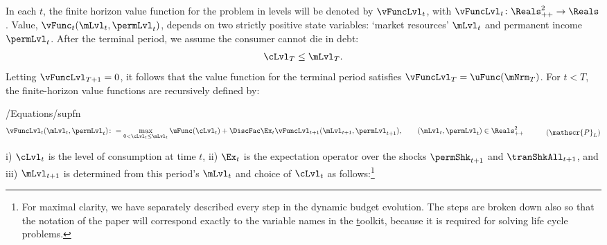 \documentclass[BufferStockTheory]{subfiles}
\begin{document}
In each $t$, the finite horizon value function for the problem in levels will be denoted by $\vFuncLvl_{t}$, with $\vFuncLvl_{t}\colon \Reals_{++}^{2}\rightarrow \Reals$. Value, $\vFunc_{t}(\mLvl_{t}, \permLvl_{t})$, depends on two strictly positive state variables: `market resources' $\mLvl_{t}$ and permanent income $\permLvl_{t}$.
After the terminal period, we assume the consumer cannot die in debt:
%
\begin{equation}\label{eq:NoDebtAtDeath}
\cLvl_{T} \leq  \mLvl_{T} .
\end{equation}
%
Letting $\vFuncLvl_{T+1} = 0$, it follows that the value function for the terminal period satisfies $\vFuncLvl_{T} = \uFunc(\mNrm_{T})$.
For $t<T$, the finite-horizon value functions are recursively defined by:

%
\begin{verbatimwrite}{\econtexRoot/Equations/supfn}
  \begin{equation}\begin{gathered}\begin{aligned}\label{eq:levelRecProblem}
    \vFuncLvl_{t}(\mLvl_{t}, \permLvl_{t})\colon & = \max_{0 < \cLvl_{t} \leq \mLvl_{t}} \uFunc(\cLvl_{t}) + \DiscFac \Ex_{t}\vFuncLvl_{t+1}(\mLvl_{t+1}, \permLvl_{t+1}), \qquad (\mLvl_{t}, \permLvl_{t})\in \Reals_{++}^{2} 
  \end{aligned}\end{gathered}
\tag{$\mathscr{P}_{L}$}
\end{equation}
\end{verbatimwrite} \unskip

 i) $\cLvl_{t}$ is the level of consumption at time $t$, ii) $\Ex_{t}$ is the expectation operator over the shocks $\permShk_{t+1}$ and $\tranShkAll_{t+1}$\hypertarget{checkRestrictions}{}\hypertarget{DBCparts}{}, and iii) $\mLvl_{t+1}$ is determined from this period's $\mLvl_{t}$ and choice of $\cLvl_{t}$ as follows:\footnote{For maximal clarity, we have separately described every step in the dynamic budget evolution.
The steps are broken down also so that the notation of the paper will correspond exactly to the variable names in the \href{https://github.com/econ-ark/HARK} toolkit, because it is required for solving life cycle problems.}%
%
\end{document}
